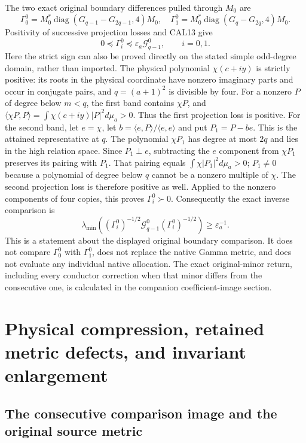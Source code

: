\documentclass[11pt,a4paper]{article}
\begin{document}
The two exact original boundary differences pulled through $M_0$ are
\[
 \Gamma_0^0=M_0^*\operatorname{diag}(G_{q-1}-G_{2q-1},4)M_0,
 \quad
 \Gamma_1^0=M_0^*\operatorname{diag}(G_q-G_{2q},4)M_0.
 \tag{CAL16}
\]
Positivity of successive projection losses and CAL13 give
\[
 0\preceq\Gamma_i^0\preceq
       \varepsilon_a\mathcal G_{q-1}^0,\qquad i=0,1.
 \tag{CAL17}
\]
Here the strict sign can also be proved directly on the stated
simple odd-degree domain, rather than imported. The physical
polynomial $\chi(c+iy)$ is strictly positive: its roots in the
physical coordinate have nonzero imaginary parts and occur in
conjugate pairs, and $q=(a+1)^2$ is divisible by four. For a
nonzero $P$ of degree below $m<q$, the first band contains $\chi P$,
and $\langle\chi P,P\rangle=\int\chi(c+iy)|P|^2d\mu_a>0$.
Thus the first projection loss is positive. For the second band,
let $e=\chi$, let $b=\langle e,P\rangle/\langle e,e\rangle$
and put $P_1=P-be$. This is the attained representative at $q$.
The polynomial $\chi P_1$ has degree at most $2q$ and lies in
the high relation space. Since $P_1\perp e$, subtracting the
$e$ component from $\chi P_1$ preserves its pairing with $P_1$.
That pairing equals $\int\chi|P_1|^2d\mu_a>0$; $P_1\ne0$
because a polynomial of degree below $q$ cannot be a nonzero
multiple of $\chi$. The second projection loss is therefore
positive as well. Applied to the nonzero components of four copies,
this proves $\Gamma_i^0\succ0$.
Consequently the exact inverse comparison is
\[
 \lambda_{\min}\!\left((\Gamma_i^0)^{-1/2}
       \mathcal G_{q-1}^0(\Gamma_i^0)^{-1/2}\right)
       \ge\varepsilon_a^{-1}.
 \tag{CAL18}
\]
This is a statement about the displayed original boundary comparison.
It does not compare $\Gamma_0^0$ with $\Gamma_1^0$, does not replace
the native Gamma metric, and does not evaluate any individual
native allocation. The exact original-minor return, including every
conductor correction when that minor differs from the consecutive
one, is calculated in the companion coefficient-image section.


\section{Physical compression, retained metric defects, and invariant enlargement}

\subsection{The consecutive comparison image and the original source metric}
\end{document}

